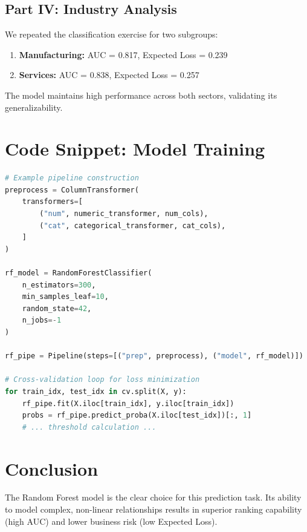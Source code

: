 \documentclass[11pt,a4paper]{article}
\begin{document}
\subsection{Part IV: Industry Analysis}
We repeated the classification exercise for two subgroups:
\begin{enumerate}
    \item \textbf{Manufacturing:} AUC = 0.817, Expected Loss = 0.239
    \item \textbf{Services:} AUC = 0.838, Expected Loss = 0.257
\end{enumerate}
The model maintains high performance across both sectors, validating its generalizability.

\section{Code Snippet: Model Training}
\begin{lstlisting}[language=Python]
# Example pipeline construction
preprocess = ColumnTransformer(
    transformers=[
        ("num", numeric_transformer, num_cols),
        ("cat", categorical_transformer, cat_cols),
    ]
)

rf_model = RandomForestClassifier(
    n_estimators=300, 
    min_samples_leaf=10, 
    random_state=42, 
    n_jobs=-1
)

rf_pipe = Pipeline(steps=[("prep", preprocess), ("model", rf_model)])

# Cross-validation loop for loss minimization
for train_idx, test_idx in cv.split(X, y):
    rf_pipe.fit(X.iloc[train_idx], y.iloc[train_idx])
    probs = rf_pipe.predict_proba(X.iloc[test_idx])[:, 1]
    # ... threshold calculation ...
\end{lstlisting}

\section{Conclusion}
The Random Forest model is the clear choice for this prediction task. Its ability to model complex, non-linear relationships results in superior ranking capability (high AUC) and lower business risk (low Expected Loss).
\end{document}
